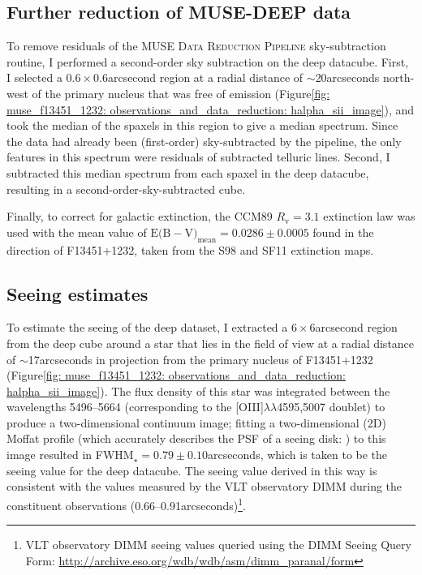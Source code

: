 \subsection{Further reduction of MUSE-DEEP data}
\label{section: section: muse_f13451_1232: observations_and_data_reduction: further_reduction}

To remove residuals of the \textsc{MUSE Data Reduction Pipeline} sky-subtraction routine, I performed a second-order sky subtraction on the deep datacube. First, I selected a $0.6\times0.6$\;arcsecond region at a radial distance of $\sim$20\;arcseconds north-west of the primary nucleus that was free of emission (Figure\;\ref{fig: muse_f13451_1232: observations_and_data_reduction: halpha_sii_image}), and took the median of the spaxels in this region to give a median spectrum. Since the data had already been (first-order) sky-subtracted by the pipeline, the only features in this spectrum were residuals of subtracted telluric lines. Second, I subtracted this median spectrum from each spaxel in the deep datacube, resulting in a second-order-sky-subtracted cube.

Finally, to correct for galactic extinction, the CCM89 $R_\mathrm{v}=3.1$ extinction law was used with the mean value of $\mathrm{E(B}-\mathrm{V)}_\mathrm{mean}=0.0286\pm0.0005$ found in the direction of F13451+1232, taken from the S98 and SF11 extinction maps.

\subsection{Seeing estimates}
\label{section: muse_f13451_1232: observations_and_data_reduction: seeing}

To estimate the seeing of the deep dataset, I extracted a $6\times6$\;arcsecond region from the deep cube around a star that lies in the field of view at a radial distance of $\sim$17\;arcseconds in projection from the primary nucleus of F13451+1232 (Figure\;\ref{fig: muse_f13451_1232: observations_and_data_reduction: halpha_sii_image}). The flux density of this star was integrated between the wavelengths 5496--5664\;{\AA} (corresponding to the [OIII]$\lambda\lambda$4595,5007 doublet) to produce a two-dimensional continuum image; fitting a two-dimensional (2D) Moffat profile (which accurately describes the PSF of a seeing disk: \citealt{Moffat1969}) to this image resulted in FWHM$_\star=0.79\pm0.10$\;arcseconds, which is taken to be the seeing value for the deep datacube. The seeing value derived in this way is consistent with the values measured by the VLT observatory DIMM during the constituent observations (0.66--0.91\;arcseconds)\footnote{VLT observatory DIMM seeing values queried using the DIMM Seeing Query Form: \url{http://archive.eso.org/wdb/wdb/asm/dimm_paranal/form}}.

